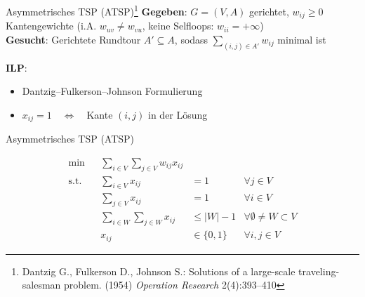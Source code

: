\documentclass[ngerman,aspectratio=169,10pt]{beamer}
\begin{document}
\begin{frame}{Asymmetrisches TSP (ATSP)\footnote{Dantzig G., Fulkerson D., Johnson S.: Solutions of a large-scale traveling-salesman problem. (1954) \emph{Operation Research} 2(4):393–410}}
	\textbf{Gegeben}: $G=(V,A)$ gerichtet, $w_{ij}\geq0$ Kantengewichte (i.A. $w_{uv}\neq w_{vu}$, keine Selfloops: $w_{ii}=+\infty$)\\
	\textbf{Gesucht}: Gerichtete Rundtour $A'\subseteq A$, sodass $\sum_{(i,j)\in A'}w_{ij}$ minimal ist
	
	\textbf{ILP}:
	\begin{itemize}
		\item Dantzig–Fulkerson–Johnson Formulierung
		\item $x_{ij}=1\quad\Leftrightarrow\quad$Kante $(i,j)$ in der Lösung
	\end{itemize}
\end{frame}
\begin{frame}{Asymmetrisches TSP (ATSP)}
	
	\begin{align*}
	\min && \sum_{i\in V}\sum_{j\in V}w_{ij}x_{ij}&&\\
	\text{s.t.} && \sum_{i\in V}x_{ij} &=1 &\forall j\in V\\
	&& \sum_{j\in V}x_{ij} &=1 &\forall i\in V\\
	&& \sum_{i\in W}\sum_{j\in W}x_{ij} &\leq|W|-1 &\forall \emptyset\neq W\subset V\\
	&& x_{ij} &\in\{0,1\} &\forall i,j\in V
	\end{align*}
\end{frame}
\end{document}
